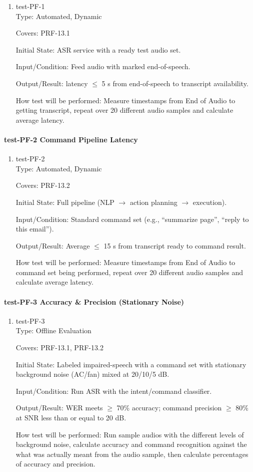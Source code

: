 \documentclass[12pt, titlepage]{article}
\begin{document}
\begin{enumerate}
\item{test-PF-1\\}
Type: Automated, Dynamic

Covers: PRF-13.1

Initial State: ASR service with a ready test audio set.

Input/Condition: Feed audio with marked end-of-speech.

Output/Result: latency $\leq$ 5 s from end-of-speech to transcript availability.

How test will be performed: Measure timestamps from End of Audio to getting transcript, repeat over 20 different audio samples and calculate average latency.
\end{enumerate}

\paragraph{test-PF-2 Command Pipeline Latency}

\begin{enumerate}
\item{test-PF-2\\}
Type: Automated, Dynamic

Covers: PRF-13.2

Initial State: Full pipeline (NLP $\rightarrow$ action planning $\rightarrow$ execution).

Input/Condition: Standard command set (e.g., “summarize page”, “reply to this email”).

Output/Result: Average $\leq$ 15 s from transcript ready to command result.

How test will be performed: Measure timestamps from End of Audio to command set being performed, repeat over 20 different audio samples and calculate average latency.
\end{enumerate}

\paragraph{test-PF-3 Accuracy \& Precision (Stationary Noise)}

\begin{enumerate}
\item{test-PF-3\\}
Type: Offline Evaluation

Covers: PRF-13.1, PRF-13.2

Initial State: Labeled impaired-speech with a command set with stationary background noise (AC/fan) mixed at 20/10/5 dB.

Input/Condition: Run ASR with the intent/command classifier.

Output/Result: WER meets $\geq$ 70\% accuracy; command precision $\geq$ 80\% at SNR less than or equal to 20 dB.

How test will be performed: Run sample audios with the different levels of background noise, calculate accuracy and command recognition against the what was actually meant from the audio sample, then calculate percentages of accuracy and precision.
\end{enumerate}
\end{document}
